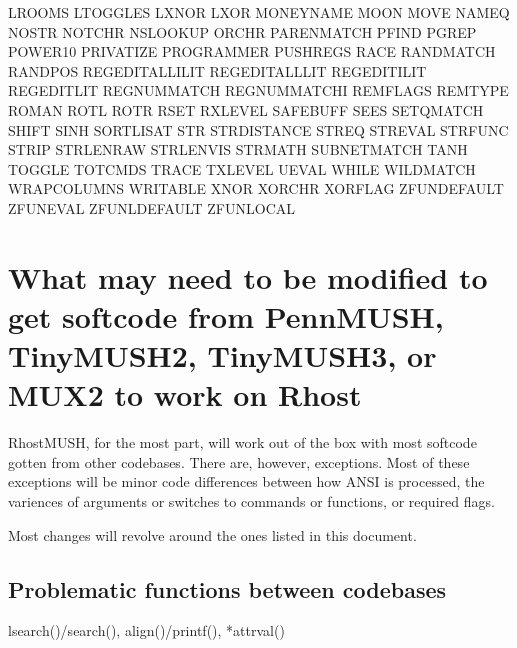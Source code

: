 \documentclass[letterpaper,10pt,english]{sphinxmanual}
\begin{document}
LROOMS                       LTOGGLES                      LXNOR
LXOR                         MONEYNAME                     MOON
MOVE                         NAMEQ                         NOSTR
NOTCHR                       NSLOOKUP                      ORCHR
PARENMATCH                   PFIND                         PGREP
POWER10                      PRIVATIZE                     PROGRAMMER
PUSHREGS                     RACE                          RANDMATCH
RANDPOS                      REGEDITALLILIT                REGEDITALLLIT
REGEDITILIT                  REGEDITLIT                    REGNUMMATCH
REGNUMMATCHI                 REMFLAGS                      REMTYPE
ROMAN                        ROTL                          ROTR
RSET                         RXLEVEL                       SAFEBUFF
SEES                         SETQMATCH                     SHIFT
SINH                         SORTLISAT                     STR
STRDISTANCE                  STREQ                         STREVAL
STRFUNC                      STRIP                         STRLENRAW
STRLENVIS                    STRMATH                       SUBNETMATCH
TANH                         TOGGLE                        TOTCMDS
TRACE                        TXLEVEL                       UEVAL
WHILE                        WILDMATCH                     WRAPCOLUMNS
WRITABLE                     XNOR                          XORCHR
XORFLAG                      ZFUNDEFAULT                   ZFUNEVAL
ZFUNLDEFAULT                 ZFUNLOCAL


\section{What may need to be modified to get softcode from PennMUSH, TinyMUSH2, TinyMUSH3, or MUX2 to work on Rhost}
\label{\detokenize{differences:what-may-need-to-be-modified-to-get-softcode-from-pennmush-tinymush2-tinymush3-or-mux2-to-work-on-rhost}}
\sphinxAtStartPar
RhostMUSH, for the most part, will work out of the box with most softcode gotten
from other codebases.  There are, however, exceptions.  Most of these exceptions
will be minor code differences between how ANSI is processed, the variences
of arguments or switches to commands or functions, or required flags.

\sphinxAtStartPar
Most changes will revolve around the ones listed in this document.


\subsection{Problematic functions between codebases}
\label{\detokenize{differences:problematic-functions-between-codebases}}
\sphinxAtStartPar
lsearch()/search(), align()/printf(), *attrval()
\end{document}
